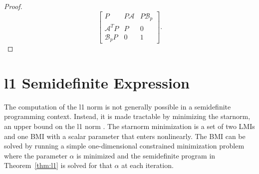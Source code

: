 \begin{proof}
	\begin{equation*}
		\begin{bmatrix}
			P & P\mathcal{A} & P\mathcal{B}_p \\
			\mathcal{A}^TP & P & 0 \\
			\mathcal{B}_pP & 0 & 1
		\end{bmatrix}.
	\end{equation*}
\end{proof}

\section{\gls{l1} Semidefinite Expression}
\label{sec:opt-l1}

The computation of the \gls{l1} norm is not generally possible in a semidefinite programming context. Instead, it is made tractable by minimizing the \gls{starnorm}, an upper bound on the \gls{l1} norm \cite{Venkatesh1995}. The \gls{starnorm} minimization is a set of two \gls{LMI}s and one \gls{BMI} with a scalar parameter that enters nonlinearly. The \gls{BMI} can be solved by running a simple one-dimensional constrained minimization problem where the parameter $\alpha$ is minimized and the semidefinite program in Theorem~\ref{thm:l1} is solved for that $\alpha$ at each iteration.

